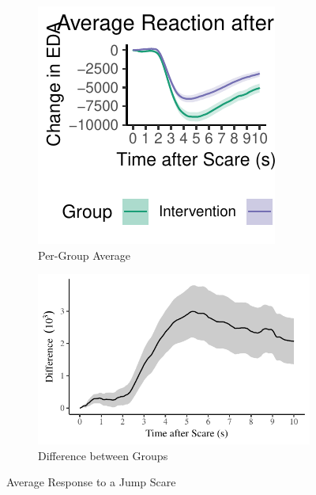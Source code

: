 \documentclass[12pt,a4paper]{article}\usepackage[]{graphicx}\usepackage[]{color}
\makeatletter
\def\maxwidth{ %
  \ifdim\Gin@nat@width>\linewidth
    \linewidth
  \else
    \Gin@nat@width
  \fi
}
\makeatother
\begin{document}
\begin{figure}[htb]
  \centering
  \begin{subfigure}[t]{.49\linewidth}


{\centering \includegraphics[width=\maxwidth]{figure/ResponseAfterScare-1} 

}



    \caption{Per-Group Average}
  \end{subfigure}
  \begin{subfigure}[t]{.49\linewidth}


{\centering \includegraphics[width=\maxwidth]{figure/CompareGroups-1} 

}



    \caption{Difference between Groups}
  \end{subfigure}
  \caption{Average Response to a Jump Scare}
  \label{fig:ResponseAfterScare}
\end{figure}
\end{document}
